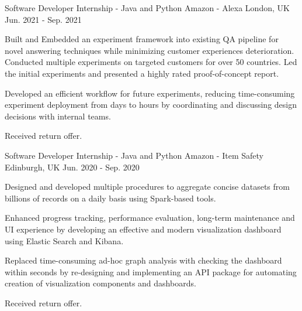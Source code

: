 

\begin{cventries}

  \cventry
    {Software Developer Internship - Java and Python} %
    {Amazon - Alexa} %
    {London, UK} %
    {Jun. 2021 - Sep. 2021} %
    {
      \begin{cvitems} %
        \item {Built and Embedded an experiment framework into existing QA pipeline for novel answering techniques while minimizing customer experiences deterioration. Conducted multiple experiments on targeted customers for over 50 countries. Led the initial experiments and presented a highly rated proof-of-concept report.}
        \item {Developed an efficient workflow for future experiments, reducing time-consuming experiment deployment from days to hours by coordinating and discussing design decisions with internal teams.}
        \item {Received return offer.}
      \end{cvitems}
    }

  \cventry
    {Software Developer Internship - Java and Python} %
    {Amazon - Item Safety} %
    {Edinburgh, UK} %
    {Jun. 2020 - Sep. 2020} %
    {
      \begin{cvitems} %
        \item {Designed and developed multiple procedures to aggregate concise datasets from  billions of records on a daily basis using Spark-based tools.}
        \item{Enhanced progress tracking, performance evaluation, long-term maintenance and UI experience by developing an effective and modern visualization dashboard using Elastic Search and Kibana.}
        \item {Replaced time-consuming ad-hoc graph analysis with checking the dashboard within seconds by re-designing and implementing an API package for automating creation of visualization components and dashboards.}
        \item {Received return offer.}
      \end{cvitems}
    }


\end{cventries}
